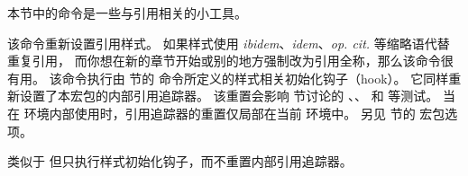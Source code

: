 
本节中的命令是一些与引用相关的小工具。

\begin{ltxsyntax}



该命令重新设置引用样式。
如果样式使用 \emph{ibidem}、\emph{idem}、\emph{op. cit.} 等缩略语代替重复引用，
而你想在新的章节开始或别的地方强制改为引用全称，那么该命令很有用。
该命令执行由  节的  命令所定义的样式相关初始化钩子（hook）。
它同样重新设置了本宏包的内部引用追踪器。
该重置会影响  节讨论的 、、 和  等测试。
当在  环境内部使用时，引用追踪器的重置仅局部在当前  环境中。
另见  节的  宏包选项。



类似于  但只执行样式初始化钩子，而不重置内部引用追踪器。




\end{ltxsyntax}
